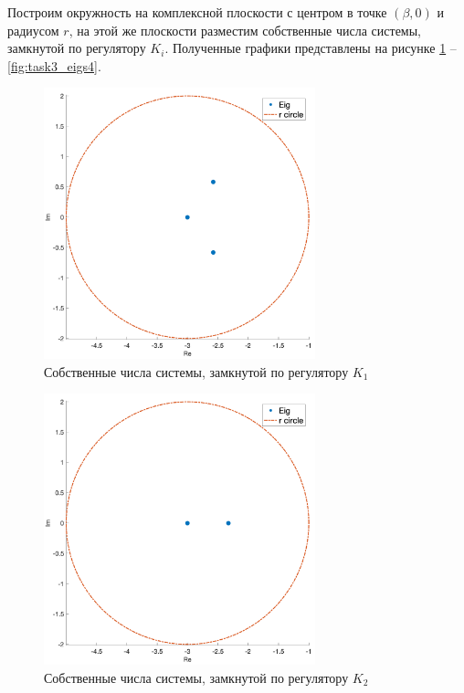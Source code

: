 Построим окружность на комплексной плоскости с центром в точке $(\beta, 0)$ и радиусом $r$, 
на этой же плоскости разместим собственные числа системы, замкнутой по регулятору $K_i$. 
Полученные графики представлены на рисунке \ref{fig:task3_eigs1} -- \ref{fig:task3_eigs4}.

\begin{figure}[ht!]
    \centering
    \includegraphics[width=0.7\textwidth]{media/plots/task3_eigs_1.png}
    \caption{Собственные числа системы, замкнутой по регулятору $K_1$}
    \label{fig:task3_eigs1}
\end{figure}
\begin{figure}[ht!]
    \centering
    \includegraphics[width=0.7\textwidth]{media/plots/task3_eigs_2.png}
    \caption{Собственные числа системы, замкнутой по регулятору $K_2$}
    \label{fig:task3_eigs2}
\end{figure}
